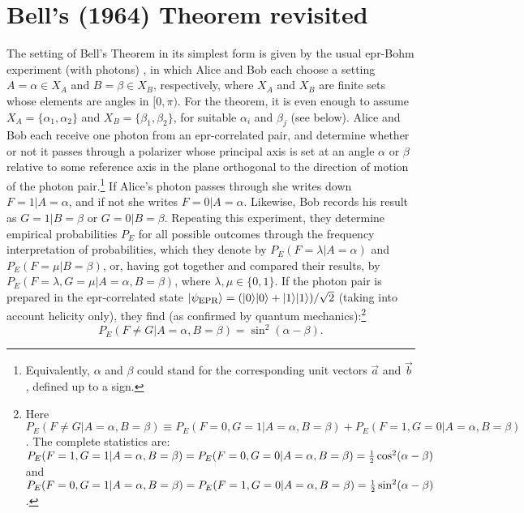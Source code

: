 \documentclass[12pt]{article}
\newcommand{\epr}{{\sc epr}}
\newcommand{\half}{\mbox{\footnotesize $\frac{1}{2}$}}
\newcommand{\qm}{quantum mechanics}
\newcommand{\al}{\alpha} \newcommand{\bt}{L\beta}
\newcommand{\lm}{\lambda} \newcommand{\Lm}{\Lambda}
\begin{document}
\section{Bell's (1964) Theorem revisited}\label{BTsec}
The setting of Bell's Theorem in its simplest form is given by the usual \epr-Bohm experiment (with photons) \cite{Bub}, in which Alice and Bob each choose a setting $A=\al\in X_A$ and $B=\beta\in X_B$, respectively, where $X_A$ and $X_B$ are finite sets whose elements are angles  in $[0,\pi)$. For the theorem, it is even enough to assume $X_A=\{\al_1,\al_2\}$ and $X_B=\{\beta_1,\beta_2\}$, for suitable $\al_i$ and $\beta_j$ (see below). Alice and Bob each receive one photon from an \epr-correlated pair, and determine whether or not it passes through a polarizer whose principal axis is set at an angle $\al$ or $\beta$ relative to some reference axis in the plane orthogonal to the direction of motion of the photon pair.\footnote{Equivalently, $\al$ and $\beta$ could stand for the corresponding unit vectors $\vec{a}$ and $\vec{b}$, defined up to a  sign.} If Alice's photon passes through she writes down $F=1|A=\al$, and if not she writes $F=0|A=\al$. Likewise, Bob records his result as $G=1|B=\beta$ or $G=0|B=\beta$. Repeating this experiment, they determine empirical probabilities $P_E$ for all possible outcomes through the frequency interpretation of probabilities, which they denote by $P_E(F=\lm|A=\al)$ and $P_E(F=\mu|B=\beta)$,
or, having got together and compared their results, by $P_E(F=\lm,G=\mu|A=\al,B=\beta)$, where $\lm,\mu\in\{0,1\}$. 
If the photon pair is prepared in the \epr-correlated state $|\psi_{\mbox{\sc epr}}\rangle=(|0\rangle|0\rangle+|1\rangle|1\rangle)/\sqrt{2}$ (taking into account  helicity only), they find (as confirmed by \qm):\footnote{\label{fn7} Here $P_E(F\neq G|A=\al,B=\beta)\equiv P_E(F=0,G=1|A=\al,B=\beta)+P_E(F=1,G=0|A=\al,B=\beta)$. The complete statistics are: $P_E(F=1,G=1|A=\al,B=\beta)=P_E(F=0,G=0|A=\al,B=\beta)=\half \cos^2(\al-\beta)$ and $P_E(F=0,G=1|A=\al,B=\beta)=P_E(F=1,G=0|A=\al,B=\beta)=\half \sin^2(\al-\beta)$.} 
\begin{equation}
P_E(F\neq G|A=\al,B=\beta)=\sin^2(\al-\beta).\label{uitkomstEPR}
\end{equation}
\end{document}
